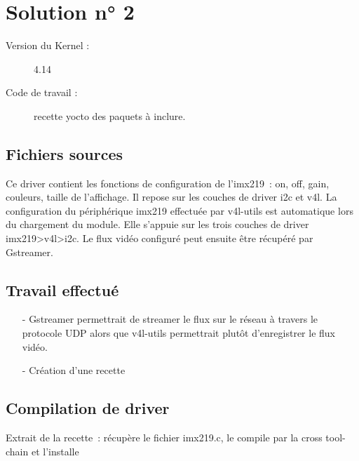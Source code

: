 
\chapter{Solution n° 2} %

\label{Chapter3} %

\begin{description}
  \item[Version du Kernel :] 4.14
  \item[Code de travail :] recette yocto des paquets à inclure.
\end{description}



\section{Fichiers sources}
Ce driver contient les fonctions de configuration de l’imx219 : on, off, gain,
couleurs, taille de l’affichage. Il repose sur les couches de driver i2c et v4l.
La configuration du périphérique imx219 effectuée par v4l-utils est automatique
lors du chargement du module. Elle s’appuie sur les trois couches de driver
imx219>v4l>i2c. Le flux vidéo configuré peut ensuite être récupéré par Gstreamer.

\section{Travail effectué}
\begin{itemize}
\item[-] Gstreamer permettrait de streamer le flux sur le réseau à travers le protocole
UDP alors que v4l-utils permettrait plutôt d’enregistrer le flux vidéo.
\item[-] Création d’une recette
\end{itemize}


\section{Compilation de driver}
Extrait de la recette : récupère le fichier imx219.c, le compile par la cross
tool-chain et l’installe

